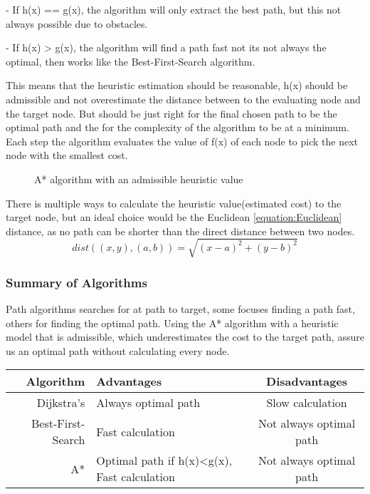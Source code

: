   - If h(x) == g(x), the algorithm will only extract the best path, but this not always possible due to obstacles.

  - If h(x) > g(x), the algorithm will find a path fast not its not always the optimal, then works like the Best-First-Search algorithm.

  This means that the heuristic estimation should be reasonable, h(x) should be admissible and not overestimate the distance between to the evaluating node and the target node. But should be just right for the final chosen path to be the optimal path and the for the complexity of the algorithm to be at a minimum. Each step the algorithm evaluates the value of f(x) of each node to pick the next node with the smallest cost.

  \begin{figure}[ht!]
    \centering
    \caption{A* algorithm with an admissible heuristic value}
    \label{overflow}
  \end{figure}

  There is multiple ways to calculate the heuristic value(estimated cost) to the target node, but an ideal choice would be the Euclidean \ref{equation:Euclidean} distance, as no path can be shorter than the direct distance between two nodes.
  \begin{equation} \label{equation:Euclidean}
    dist((x, y), (a, b)) = \sqrt{(x - a)^2 + (y - b)^2}
  \end{equation}

  \subsubsection{Summary of Algorithms}

  Path algorithms searches for at path to target, some focuses finding a path fast, others for finding the optimal path. Using the A* algorithm with a heuristic model that is admissible, which underestimates the cost to the target path, assure us an optimal path without calculating every node.

  \begin{tabular}{|r|l|c|}
    \hline
    Algorithm&Advantages&Disadvantages\\
    \hline
    Dijkstra's&Always optimal path&Slow calculation\\
    Best-First-Search&Fast calculation&Not always optimal path\\
    A*&Optimal path if h(x)<g(x), Fast calculation&Not always optimal path\\
    \hline
  \end{tabular}
